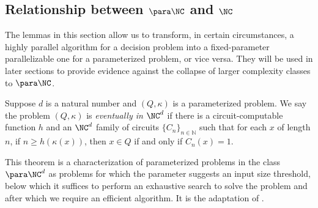 \documentclass{article}
\begin{document}
\subsection{Relationship between \texorpdfstring{$\para \NC$}{paraNC} and \texorpdfstring{$\NC$}{NC}}

The lemmas in this section allow us to transform, in certain circumstances, a highly parallel algorithm for a decision problem into a fixed-parameter parallelizable one for a parameterized problem, or vice versa.
They will be used in later sections to provide evidence against the collapse of larger complexity classes to $\para \NC$.

\begin{definition}\label{def:eventually}
  Suppose $d$ is a natural number and $(Q, \kappa)$ is a parameterized problem.
  We say the problem $(Q, \kappa)$ is \emph{eventually in $\NC^d$} if there is a circuit-computable function $h$ and an $\NC^d$ family of circuits $\{C_n\}_{n \in \mathbb{N}}$ such that for each $x$ of length $n$, if $n \geq h(\kappa(x))$, then $x \in Q$ if and only if $C_n(x) = 1$.
\end{definition}

This theorem is a characterization of parameterized problems in the class $\para \NC^d$ as problems for which the parameter suggests an input size threshold, below which it suffices to perform an exhaustive search to solve the problem and after which we require an efficient algorithm.
It is the adaptation of \autocite[Theorem~1.37]{fg06}.
\end{document}
